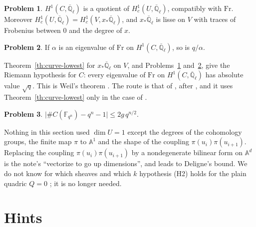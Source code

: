 \documentclass[reqno]{amsart}
\theoremstyle{definition}
\newtheorem{problem}{Problem}[section]
\theoremstyle{plain}
\newcommand{\Q}{\mathbb{Q}}
\newcommand{\F}{\mathbb{F}}
\newcommand{\A}{\mathbb{A}}
\newcommand{\Ql}{\overline{\Q}_\ell}
\newcommand{\Fr}{\mathrm{Fr}}
\begin{document}
\begin{problem}\label{pr:quotient}
\(H^1(C, \Ql)\) is a quotient of \(H^1_c(U, \Ql)\), compatibly with \(\Fr\).  Moreover \(H^1_c(U, \Ql) = H^1_c(V, x_*\Ql)\), and \(x_*\Ql\) is lisse on \(V\) with traces of Frobenius between \(0\) and the degree of \(x\).
\end{problem}

\begin{problem}\label{pr:lower}
If \(\alpha\) is an eigenvalue of \(\Fr\) on \(H^1(C, \Ql)\), so is \(q/\alpha\).
\end{problem}

Theorem~\ref{th:curve-lowest} for \(x_*\Ql\) on \(V\), and Problems~\ref{pr:quotient} and~\ref{pr:lower}, give the Riemann hypothesis for \(C\): every eigenvalue of \(\Fr\) on \(H^1(C, \Ql)\) has absolute value \(\sqrt q\).  This is Weil's theorem \cite{Wei48}.  The route is that of \cite{Ald}, after \cite{Alp}, and it uses Theorem~\ref{th:curve-lowest} only in the case of \cite[Theorem~1.1 and Remark~1.2]{Zh}.

\begin{problem}\label{pr:count}
\(\lvert \#C(\F_{q^n}) - q^n - 1 \rvert \le 2g\, q^{n/2}\).
\end{problem}

Nothing in this section used \(\dim U = 1\) except the degrees of the cohomology groups, the finite map \(\pi\) to \(\A^1\) and the shape of the coupling \(\pi(u_i)\pi(u_{i+1})\).  Replacing the coupling \(\pi(u_i)\pi(u_{i+1})\) by a nondegenerate bilinear form on \(\A^d\) is the note's ``vectorize to go up dimensions'', and leads to Deligne's bound.  We do not know for which sheaves and which \(k\) hypothesis (H2) holds for the plain quadric \(Q = 0\) \cite[Question~2.10.10]{Dup}; it is no longer needed.

\section*{Hints}
\end{document}
